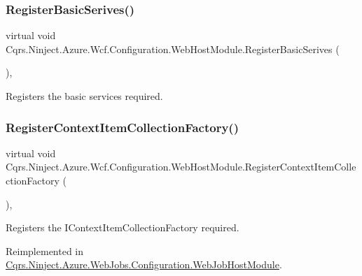 \subsubsection{\texorpdfstring{Register\+Basic\+Serives()}{RegisterBasicSerives()}}
{\footnotesize\ttfamily virtual void Cqrs.\+Ninject.\+Azure.\+Wcf.\+Configuration.\+Web\+Host\+Module.\+Register\+Basic\+Serives (\begin{DoxyParamCaption}{ }\end{DoxyParamCaption})\hspace{0.3cm}{\ttfamily [protected]}, {\ttfamily [virtual]}}



Registers the basic services required. 

\mbox{\label{classCqrs_1_1Ninject_1_1Azure_1_1Wcf_1_1Configuration_1_1WebHostModule_a796f167e2cf851a069bd92e4d9c10846_a796f167e2cf851a069bd92e4d9c10846}} 
\subsubsection{\texorpdfstring{Register\+Context\+Item\+Collection\+Factory()}{RegisterContextItemCollectionFactory()}}
{\footnotesize\ttfamily virtual void Cqrs.\+Ninject.\+Azure.\+Wcf.\+Configuration.\+Web\+Host\+Module.\+Register\+Context\+Item\+Collection\+Factory (\begin{DoxyParamCaption}{ }\end{DoxyParamCaption})\hspace{0.3cm}{\ttfamily [protected]}, {\ttfamily [virtual]}}



Registers the I\+Context\+Item\+Collection\+Factory required. 



Reimplemented in \hyperlink{classCqrs_1_1Ninject_1_1Azure_1_1WebJobs_1_1Configuration_1_1WebJobHostModule_a478ea88f9dd4740ffd11b5d169683e2b_a478ea88f9dd4740ffd11b5d169683e2b}{Cqrs.\+Ninject.\+Azure.\+Web\+Jobs.\+Configuration.\+Web\+Job\+Host\+Module}.

